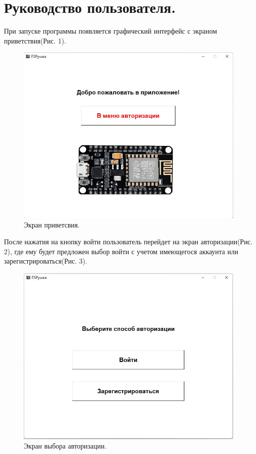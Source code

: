 \documentclass[a4document]{article}
\begin{document}
{
\newpage
\section*{Руководство пользователя.} 
При запуске программы появляется графический интерфейс с экраном приветствия(Рис. 1). 
\\

\begin{figure}[htp]
    \centering
    \includegraphics[width=0.5\linewidth]{Pics/WelcomeScreen.jpg}
    \caption{Экран приветсвия.}
    \label{fig:pk1}
\end{figure}

\noindent
После нажатия на кнопку войти пользователь перейдет на экран авторизации(Рис. 2), 
где ему будет предложен выбор войти с учетом имеющегося аккаунта или 
зарегистрироваться(Рис. 3). 

\begin{figure}[htp]
    \centering
    \includegraphics[width=0.5\linewidth]{Pics/AutorizationScreen.jpg}
    \caption{Экран выбора авторизации.}
    \label{fig:pk2}
\end{figure}

}
\end{document}
